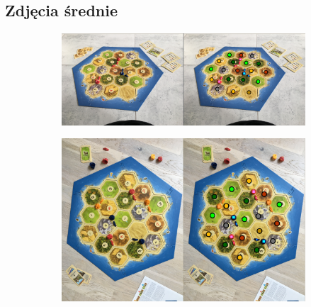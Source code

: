 \documentclass[a4paper]{article}
\begin{document}
    \subsection{Zdjęcia średnie}
    
    \begin{figure}[H]
        \begin{subfigure}[]{\linewidth}
            \includegraphics[width=\linewidth]{pictures/results/result19.png}
        \end{subfigure}

        \begin{subfigure}[]{\linewidth}
            \includegraphics[width=\linewidth]{pictures/results/result21.png}
        \end{subfigure}
        

\end{figure}
\end{document}
